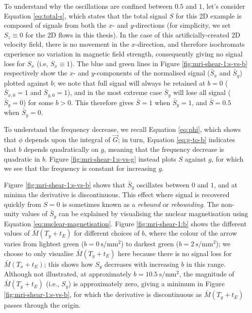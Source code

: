                 To understand why the oscillations are confined between $0.5$ and $1$, let's consider Equation \eqref{eq:total-s}, which states that the total signal $S$ for this 2D example is composed of signals from both the $x$- and $y$-directions (for simplicity, we set $S_z \equiv 0$ for the 2D flows in this thesis). In the case of this artificially-created 2D velocity field, there is no movement in the $x$-direction, and therefore isochromats experience no variation in magnetic field strength, consequently giving no signal loss for $S_x$ (i.e, $S_x \equiv 1$). The blue and green lines in Figure \ref{fig:mri-shear-1:s-vs-b} respectively show the $x$- and $y$-components of the normalised signal ($\bar{S}_x$ and $\bar{S}_y$) plotted against $b$; we note that full signal will always be retained at $b=0$ ($\bar{S}_{x,0} = 1$ and $\bar{S}_{y,0} = 1$), and in the most extreme case $\bar{S}_y$ will lose all signal ($\bar{S}_y = 0$) for some $b > 0$. This therefore gives $\bar{S} = 1$ when $\bar{S}_y = 1$, and $\bar{S} = 0.5$ when $\bar{S}_y = 0$.
                
                To understand the frequency decrease, we recall Equation \eqref{eq:phi}, which shows that $\phi$ depends upon the integral of $\vec{G}$; in turn, Equation \eqref{eq:g-to-b} indicates that $b$ depends quadratically on $g$, meaning that the frequency decrease is quadratic in $b$. Figure \ref{fig:mri-shear-1:s-vs-g} instead plots $S$ against $g$, for which we see that the frequency is constant for increasing $g$.
                
                Figure \ref{fig:mri-shear-1:s-vs-b} shows that $\bar{S}_y$ oscillates between $0$ and $1$, and at minima the derivative is discontinuous. This effect where signal is recovered quickly from $S=0$ is sometimes known as a \textit{rebound} or \textit{rebounding}. The non-unity values of $\bar{S}_y$ can be explained by visualising the nuclear magnetisation using Equation \eqref{eq:nuclear-magnetisation}. Figure \ref{fig:mri-shear-1:b} shows the different values of $\bar{M}(T_y + t_E)$ for different choices of $b$, where the colour of the arrow varies from lightest green ($b=\qty{0}{\second\per\milli\metre^2}$) to darkest green ($b=\qty{2}{\second\per\milli\metre^2}$); we choose to only visualise $\bar{M}(T_y + t_E)$ here because there is no signal loss for $\bar{M}(T_x + t_E)$; this shows how $S_y$ decreases with increasing $b$ in this range. Although not illustrated, at approximately $b=\qty{10.5}{\second\per\milli\metre^2}$, the magnitude of $\bar{M}(T_y + t_E)$ (i.e., $S_y$) is approximately zero, giving a minimum in Figure \ref{fig:mri-shear-1:s-vs-b}, for which the derivative is discontinuous as $\bar{M}(T_y + t_E)$ passes through the origin.
                
